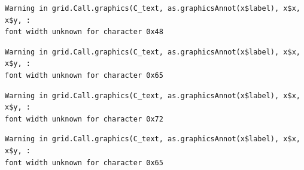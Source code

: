 \documentclass[
  letterpaper,
]{scrbook}
\newenvironment{Shaded}{\begin{snugshade}}{\end{snugshade}}
\newcommand{\AttributeTok}[1]{\textcolor[rgb]{0.40,0.45,0.13}{#1}}
\newcommand{\DecValTok}[1]{\textcolor[rgb]{0.68,0.00,0.00}{#1}}
\newcommand{\FunctionTok}[1]{\textcolor[rgb]{0.28,0.35,0.67}{#1}}
\newcommand{\NormalTok}[1]{\textcolor[rgb]{0.00,0.23,0.31}{#1}}
\newcommand{\OtherTok}[1]{\textcolor[rgb]{0.00,0.23,0.31}{#1}}
\newcommand{\SpecialCharTok}[1]{\textcolor[rgb]{0.37,0.37,0.37}{#1}}
\newcommand{\StringTok}[1]{\textcolor[rgb]{0.13,0.47,0.30}{#1}}
\begin{document}
\begin{Shaded}
\end{Shaded}

\begin{verbatim}
Warning in grid.Call.graphics(C_text, as.graphicsAnnot(x$label), x$x, x$y, :
font width unknown for character 0x48
\end{verbatim}

\begin{verbatim}
Warning in grid.Call.graphics(C_text, as.graphicsAnnot(x$label), x$x, x$y, :
font width unknown for character 0x65
\end{verbatim}

\begin{verbatim}
Warning in grid.Call.graphics(C_text, as.graphicsAnnot(x$label), x$x, x$y, :
font width unknown for character 0x72
\end{verbatim}

\begin{verbatim}
Warning in grid.Call.graphics(C_text, as.graphicsAnnot(x$label), x$x, x$y, :
font width unknown for character 0x65
\end{verbatim}
\end{document}
